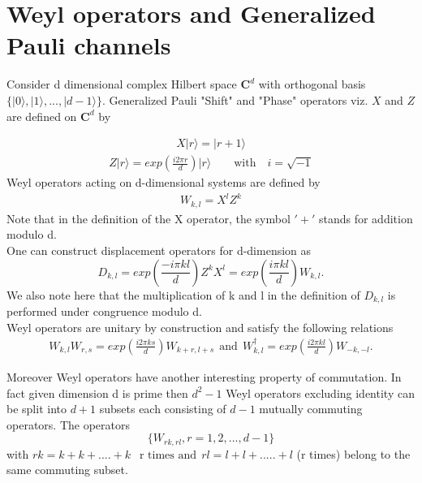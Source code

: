 \documentclass[12pt]{amsart}
\numberwithin{equation}{section}
\begin{document}
\section{Weyl operators and Generalized Pauli channels}\label{II}
Consider d dimensional complex Hilbert space $\mathbf{C}^d$ with orthogonal basis $\lbrace \vert 0 \rangle, \vert 1 \rangle,..., \vert d-1 \rangle \rbrace $. Generalized Pauli "Shift" and "Phase" operators viz. $X$ and $Z$ are defined on $\mathbf{C}^d$ by

\begin{eqnarray*}
    X \vert r \rangle = \vert r+1  \rangle
\end{eqnarray*}
\begin{eqnarray*}
    Z \vert r \rangle = exp\left(\frac{i 2 \pi r }{d}\right) \vert r \rangle \qquad \text{with} \quad i=\sqrt{-1}
\end{eqnarray*}
Weyl operators acting on d-dimensional systems are defined by 
\begin{eqnarray*}
    W_{k,l}=X^lZ^k
\end{eqnarray*}
Note that in the definition of the X operator, the symbol $'+'$ stands for addition modulo d. \\

One can construct displacement operators for d-dimension as 
\begin{equation}\label{Weyl}
    D_{k,l}=exp\left(\frac{-i \pi k l  }{d}\right) Z^{k} X^{l}= exp\left(\frac{i \pi k l  }{d}\right) W_{k,l}.
\end{equation}
We also note here that the multiplication of k and l in the definition of $D_{k,l}$ is performed under congruence modulo d.\\

Weyl operators are unitary by construction and satisfy the following relations 
\begin{eqnarray*}
W_{k,l} W_{r,s} = exp\left( \frac{i 2 \pi ks }{d}\right) W_{k+r, l+s} ~~\text{and}~~W^{\dagger}_{k,l}=exp\left( \frac{i 2 \pi kl }{d}\right) W_{-k,-l}.
\end{eqnarray*}

Moreover Weyl operators have another interesting property of commutation. In fact given dimension d  is prime then $d^2-1$ Weyl operators excluding identity can be split into $d+1$ subsets each consisting of $d-1$ mutually commuting operators. The operators
\[\lbrace  W_{rk,rl}, r=1, 2,...,d-1 \rbrace\] with $rk=k + k +....+ k ~~  \text{ r times and}~~ rl= l + l + ..... +l $ (r times) belong to the same commuting subset. \\
\end{document}

